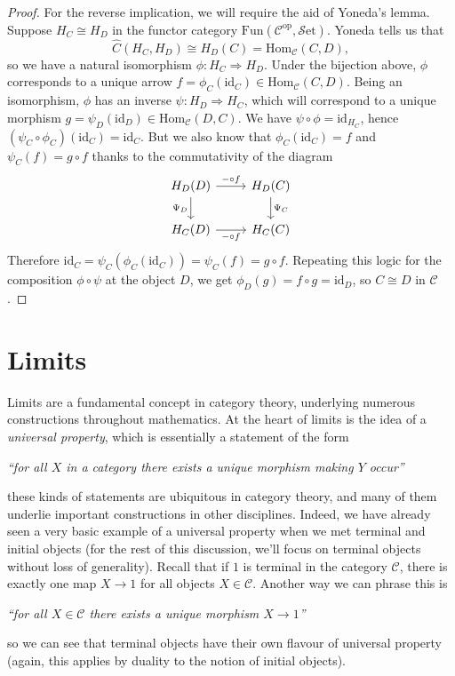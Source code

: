\documentclass[10pt,oneside]{book}
\def\~#1{\mathscr{#1}}
\newcommand{\op}{\mathrm{op}}
\newcommand{\Hom}{\mathrm{Hom}}
\newcommand{\id}{\mathrm{id}}
\newcommand{\Fun}{\mathrm{Fun}}
\newcommand{\Set}{\~S\mathrm{et}}
\theoremstyle{plain}
\theoremstyle{definition}
\theoremstyle{remark}
\numberwithin{equation}{section}
\numberwithin{figure}{section}
\begin{document}
\begin{proof}
    For the reverse implication, we will require the aid of Yoneda's lemma. Suppose $H_C \cong H_D$ in the functor category $\Fun \left(\~C^\op, \Set \right)$. Yoneda tells us that
    \[\widehat{C}(H_C, H_D) \cong H_D(C) = \Hom_{\~C}(C,D),\]
    so we have a natural isomorphism $\phi: H_C \Rightarrow H_D$. Under the bijection above, $\phi$ corresponds to a unique arrow $f = \phi_C(\id_C) \in \Hom_{\~C}(C, D)$. Being an isomorphism, $\phi$ has an inverse $\psi: H_D \Rightarrow H_C$, which will correspond to a unique morphism $g = \psi_D(\id_D) \in \Hom_{\~C}(D,C)$. We have $\psi \circ \phi = \id_{H_C}$, hence $(\psi_C \circ \phi_C)(\id_C) = \id_C$. But we also know that $\phi_C(\id_C) = f$ and $\psi_C(f) = g \circ f$ thanks to the commutativity of the diagram
    \[\begin{tikzcd}
    {H_D(D)} & {H_D(C)} \\
    {H_C(D)} & {H_C(C)}
    \arrow["{- \circ f}", from=1-1, to=1-2]
    \arrow["{\Psi_D}"', from=1-1, to=2-1]
    \arrow["{\Psi_C}", from=1-2, to=2-2]
    \arrow["{- \circ f}"', from=2-1, to=2-2]
\end{tikzcd}\]
Therefore $\id_C = \psi_C(\phi_C(\id_C)) = \psi_C(f) = g \circ f$. Repeating this logic for the composition $\phi \circ \psi$ at the object $D$, we get $\phi_D(g) = f \circ g = \text{id}_D$, so $C \cong D$ in $\~C$. 
\end{proof}

\chapter{Limits}

Limits are a fundamental concept in category theory, underlying numerous constructions throughout mathematics. At the heart of limits is the idea of a \emph{universal property}, which is essentially a statement of the form
\begin{center}
    \emph{``for all $X$ in a category there exists a unique morphism making $Y$ occur''}
\end{center}
these kinds of statements are ubiquitous in category theory, and many of them underlie important constructions in other disciplines. Indeed, we have already seen a very basic example of a universal property when we met terminal and initial objects (for the rest of this discussion, we'll focus on terminal objects without loss of generality). Recall that if $1$ is terminal in the category $\~C$, there is exactly one map $X \to 1$ for all objects $X \in \~C$. Another way we can phrase this is 
\begin{center}
    \emph{``for all $X \in \~C$ there exists a unique morphism $X \to 1$''}
\end{center}
so we can see that terminal objects have their own flavour of universal property (again, this applies by duality to the notion of initial objects). 
\end{document}
